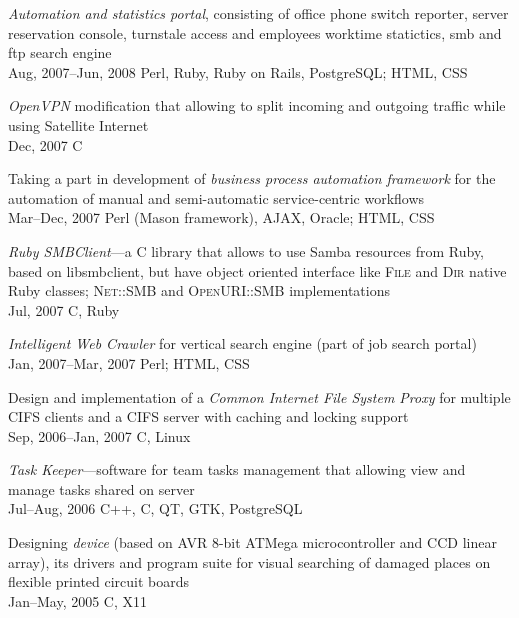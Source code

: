 \documentclass[12pt, a4paper]{article}
\newcommand{\years}[2]{\marginpar{\scriptsize #1 #2}}
\begin{document}
\begin{list}{}{\leftmargin=0pt}
		\item \textit {Automation and statistics portal}, consisting of office phone switch
		reporter, server reservation console, turnstale access and employees
		worktime statictics, smb and ftp search engine\\
		Aug, 2007--Jun, 2008 \hfill Perl, Ruby, Ruby on Rails, PostgreSQL; HTML, CSS

		\item \textit{OpenVPN} modification that allowing to split incoming and outgoing traffic while using Satellite
		Internet\\
		Dec, 2007 \hfill C

		\item Taking a part in development of \textit{business process automation framework}
		for the automation of manual and semi-automatic service-centric
		workflows\\
		Mar--Dec, 2007 \hfill Perl (Mason framework), AJAX, Oracle; HTML, CSS

		\item \textit{Ruby SMBClient}---a C library that allows to use Samba resources from Ruby, based on
		libsmbclient, but have object oriented interface like \textsc{File} and \textsc{Dir} native Ruby classes;
		\textsc{Net::SMB} and \textsc{OpenURI::SMB} implementations\\
		Jul, 2007 \hfill C, Ruby

		\item \textit{Intelligent Web Crawler} for vertical search engine (part of job search
		portal)\\
		Jan, 2007--Mar, 2007 \hfill Perl; HTML, CSS

		\item Design and implementation of a \textit{Common Internet File System Proxy}
		for multiple CIFS clients and a CIFS server with caching and locking
		support\\
		Sep, 2006--Jan, 2007 \hfill C, Linux

		\item \textit{Task Keeper}---software for team tasks management that allowing view and
		manage tasks shared on server\\
		Jul--Aug, 2006 \hfill C++, C, QT, GTK, PostgreSQL

		\item Designing \textit{device} \years{2005}{University project} (based on AVR 8-bit ATMega microcontroller and CCD
		linear array), its drivers and program suite for visual searching of damaged
		places on flexible printed circuit boards\\
		Jan--May, 2005 \hfill C, X11
	\end{list}
\end{document}
